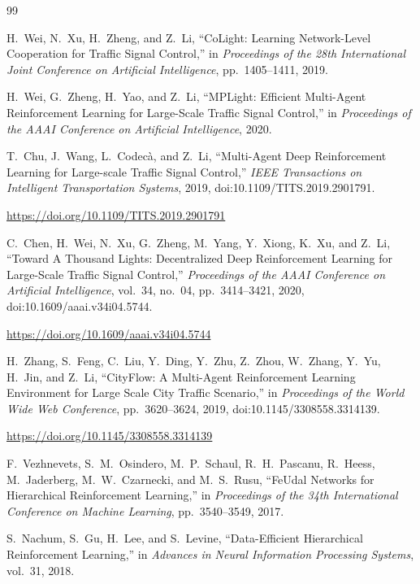 \documentclass[3p,times]{elsarticle}
\theoremstyle{plain}
\theoremstyle{definition}
\begin{document}
\begin{thebibliography}{99}

H.~Wei, N.~Xu, H.~Zheng, and Z.~Li,
``CoLight: Learning Network-Level Cooperation for Traffic Signal
Control,''
in \textit{Proceedings of the 28th International Joint Conference on
Artificial Intelligence},
pp.~1405--1411, 2019.

H.~Wei, G.~Zheng, H.~Yao, and Z.~Li,
``MPLight: Efficient Multi-Agent Reinforcement Learning for
Large-Scale Traffic Signal Control,''
in \textit{Proceedings of the AAAI Conference on Artificial
Intelligence}, 2020.

T.~Chu, J.~Wang, L.~Codec\`a, and Z.~Li,
``Multi-Agent Deep Reinforcement Learning for Large-scale Traffic
Signal Control,''
\textit{IEEE Transactions on Intelligent Transportation Systems},
2019,
doi:10.1109/TITS.2019.2901791.

\url{https://doi.org/10.1109/TITS.2019.2901791}

C.~Chen, H.~Wei, N.~Xu, G.~Zheng, M.~Yang, Y.~Xiong, K.~Xu,
and Z.~Li,
``Toward A Thousand Lights: Decentralized Deep Reinforcement
Learning for Large-Scale Traffic Signal Control,''
\textit{Proceedings of the AAAI Conference on Artificial
Intelligence},
vol.~34, no.~04, pp.~3414--3421, 2020,
doi:10.1609/aaai.v34i04.5744.

\url{https://doi.org/10.1609/aaai.v34i04.5744}

H.~Zhang, S.~Feng, C.~Liu, Y.~Ding, Y.~Zhu, Z.~Zhou, W.~Zhang,
Y.~Yu, H.~Jin, and Z.~Li,
``CityFlow: A Multi-Agent Reinforcement Learning Environment for
Large Scale City Traffic Scenario,''
in \textit{Proceedings of the World Wide Web Conference},
pp.~3620--3624, 2019,
doi:10.1145/3308558.3314139.

\url{https://doi.org/10.1145/3308558.3314139}

F.~Vezhnevets, S.~M.~Osindero, M.~P.~Schaul, R.~H.~Pascanu,
R.~Heess, M.~Jaderberg, M.~W.~Czarnecki, and M.~S.~Rusu,
``FeUdal Networks for Hierarchical Reinforcement Learning,''
in \textit{Proceedings of the 34th International Conference on
Machine Learning},
pp.~3540--3549, 2017.

S.~Nachum, S.~Gu, H.~Lee, and S.~Levine,
``Data-Efficient Hierarchical Reinforcement Learning,''
in \textit{Advances in Neural Information Processing Systems},
vol.~31, 2018.


\end{thebibliography}
\end{document}
